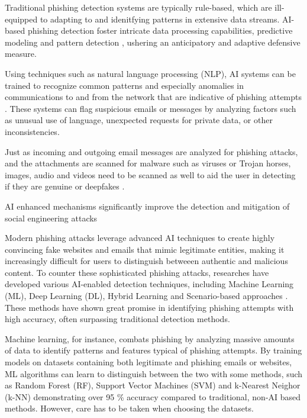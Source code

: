 Traditional phishing detection systems are typically rule-based, which are ill-equipped to adapting to and idenitfying patterns in extensive data streams. AI-based phishing detection foster intricate data processing capabilities, predictive modeling and pattern detection \citep{fakhouriAIDrivenSolutionsForSocialEngineeringAttacks2024}, ushering an anticipatory and adaptive defensive measure.

Using techniques such as natural language processing (NLP), AI systems can be trained to recognize common patterns and especially anomalies in communications to and from the network that are indicative of phishing attempts \citep{basitComprehensiveSurveyAIenabledPhishingAttacks2021}. These systems can flag suspicious emails or messages by analyzing factors such as unusual use of language, unexpected requests for private data, or other inconsistencies.

Just as incoming and outgoing email messages are analyzed for phishing attacks, and the attachments are scanned for malware such as viruses or Trojan horses, images, audio and videos need to be scanned as well to aid the user in detecting if they are genuine or deepfakes \citep{mirskyTheCreationAndDetectionOfDeepfakes2021}.

AI enhanced mechanisms significantly improve the detection and mitigation of social engineering attacks \citep{fakhouriAIDrivenSolutionsForSocialEngineeringAttacks2024}

Modern phishing attacks leverage advanced AI techniques to create highly convincing fake websites and emails that mimic legitimate entities, making it increasingly difficult for users to distinguish betweeen authentic and malicious content. To counter these sophisticated phishing attacks, researches have developed various AI-enabled detection techniques, including Machine Learning (ML), Deep Learning (DL), Hybrid Learning and Scenario-based approaches \citep{basitComprehensiveSurveyAIenabledPhishingAttacks2021}. These methods have shown great promise in identifying phishing attempts with high accuracy, often surpassing traditional detection methods.


Machine learning, for instance, combats phishing by analyzing massive amounts of data to identify patterns and features typical of phishing attempts. By training models on datasets containing both legitimate and phishing emails or websites, ML algorithms can learn to distinguish between the two with some methods, such as Random Forest (RF), Support Vector Machines (SVM) and k-Nearest Neighor (k-NN) demonstrating over 95 \% accuracy compared to traditional, non-AI based methods. However, care has to be taken when choosing the datasets.

